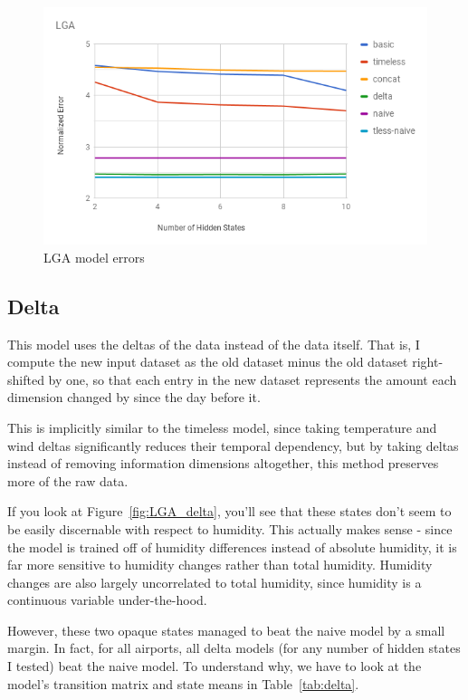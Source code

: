 \documentclass[a4paper]{article}
\begin{document}
\begin{figure}[t]
  \centering
  \includegraphics[width=\linewidth]{../png/analysis/LGA.png}
  \caption{LGA model errors}
  \label{fig:LGA_models}
\end{figure}



\subsection{Delta}


This model uses the deltas of the data instead of the data itself. That is, I compute the new input dataset as the old dataset minus the old dataset right-shifted by one, so that each entry in the new dataset represents the amount each dimension changed by since the day before it.

This is implicitly similar to the timeless model, since taking temperature and wind deltas significantly reduces their temporal dependency, but by taking deltas instead of removing information dimensions altogether, this method preserves more of the raw data.

If you look at Figure~\ref{fig:LGA_delta}, you'll see that these states don't seem to be easily discernable with respect to humidity. This actually makes sense - since the model is trained off of humidity differences instead of absolute humidity, it is far more sensitive to humidity changes rather than total humidity. Humidity changes are also largely uncorrelated to total humidity, since humidity is a continuous variable under-the-hood. 

However, these two opaque states managed to beat the naive model by a small margin. In fact, for all airports, all delta models (for any number of hidden states I tested) beat the naive model. To understand why, we have to look at the model's transition matrix and state means in Table~\ref{tab:delta}.
\end{document}

